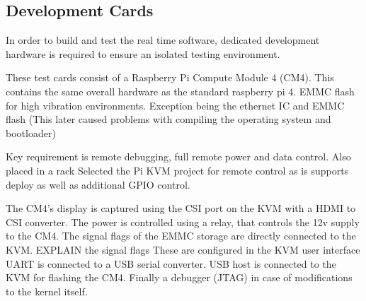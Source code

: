 \newpage

\subsection{Development Cards}

In order to build and test the real time software, dedicated development hardware is required to ensure an isolated testing environment.

These test cards consist of a Raspberry Pi Compute Module 4 (CM4).
This contains the same overall hardware as the standard raspberry pi 4.
EMMC flash for high vibration environments.
Exception being the ethernet IC and EMMC flash (This later caused problems with compiling the operating system and bootloader)

Key requirement is remote debugging, full remote power and data control.
Also placed in a rack
Selected the Pi KVM project for remote control as is supports deploy as well as additional GPIO control.

The CM4’s display is captured using the CSI port on the KVM with a HDMI to CSI converter.
The power is controlled using a relay, that controls the 12v supply to the CM4.
The signal flags of the EMMC storage are directly connected to the KVM. EXPLAIN the signal flags
These are configured in the KVM user interface
UART is connected to a USB serial converter.
USB host is connected to the KVM for flashing the CM4.
Finally a debugger (JTAG) in case of modifications to the kernel itself.

